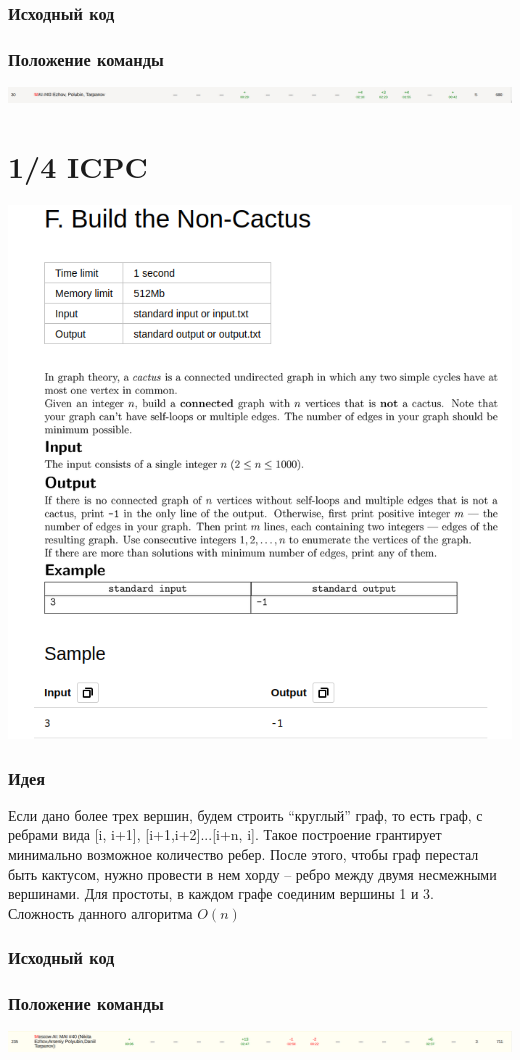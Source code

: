 \documentclass[12pt]{article}
\begin{document}
\subsubsection*{Исходный код}

\subsubsection*{Положение команды}
\includegraphics[scale=0.5]{images/8.png}\newline\noindent

\pagebreak
\section{1/4 ICPC}
\includegraphics[scale=0.75]{statements/QuarterFinal_F.png}
\subsubsection*{Идея}
Если дано более трех вершин, будем строить “круглый” граф, то есть граф, с ребрами вида [i, i+1], [i+1,i+2]...[i+n, i]. Такое построение 
грантирует минимально возможное количество ребер. После этого, чтобы граф перестал быть кактусом,  нужно провести в нем хорду – ребро между 
двумя несмежными вершинами. Для простоты, в каждом графе соединим вершины 1 и 3.
\\ 
Сложность данного алгоритма $O(n)$
\subsubsection*{Исходный код}

\subsubsection*{Положение команды}
\includegraphics[scale=0.5]{images/QuarterFinal.png}\newline\noindent
\end{document}
